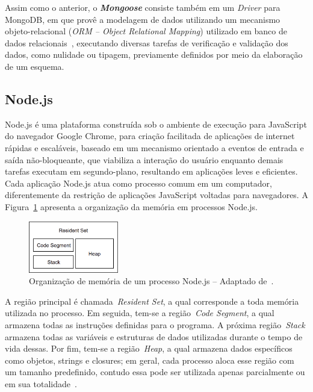 \documentclass[12pt]{article}
\begin{document}
Assim como o anterior, o \textbf{\textit{Mongoose}} consiste também em um \emph{Driver} para MongoDB, em que provê a modelagem de dados utilizando um mecanismo objeto-relacional (\emph{ORM -- Object Relational Mapping}) utilizado em banco de dados relacionais~\cite{mardan2014boosting}, executando diversas tarefas de verificação e validação dos dados, como nulidade ou tipagem, previamente definidos por meio da elaboração de um esquema.

\subsection{Node.js}
\label{subsection:nodejs}

Node.js é uma plataforma construída sob o ambiente de execução para JavaScript do navegador Google Chrome, para criação facilitada de aplicações de internet rápidas e escaláveis, baseado em um mecanismo orientado a eventos de entrada e saída não-bloqueante, que viabiliza a interação do usuário enquanto demais tarefas executam em segundo-plano, resultando em aplicações leves e eficientes.
Cada aplicação Node.js atua como processo comum em um computador, diferentemente da restrição de aplicações JavaScript voltadas para navegadores. A Figura~\ref{figure:memoria} apresenta a organização da memória em processos Node.js.

\begin{figure}[!h]
    \centering
    \includegraphics[width=0.35\textwidth]{images/set}
    \caption{Organização de memória de um processo Node.js -- Adaptado de~\cite{nodememory}.}
    \label{figure:memoria}
\end{figure} 

A região principal é chamada~\emph{Resident Set}, a qual corresponde a toda memória utilizada no processo. Em seguida, tem-se a região~\emph{Code Segment}, a qual armazena todas as instruções definidas para o programa. A próxima região~\emph{Stack} armazena todas as variáveis e estruturas de dados utilizadas durante o tempo de vida dessas. Por fim, tem-se a região~\emph{Heap}, a qual armazena dados específicos como objetos, strings e closures; em geral, cada processo aloca esse região com um tamanho predefinido, contudo essa pode ser utilizada apenas parcialmente ou em sua totalidade~\cite{nodememory}. 
\end{document}
